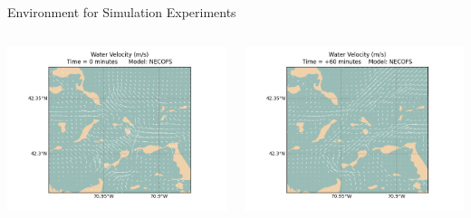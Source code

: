 \documentclass[9pt,xcolor=table]{beamer}
\begin{document}
\begin{frame}{Environment for Simulation Experiments}
\begin{columns}
\begin{column}{0.5\textwidth}
            \includegraphics[width=\textwidth,trim={0cm 0cm 0cm 0cm},clip]{img/full_water_1.png}
        \end{column}
        \begin{column}{0.5\textwidth}
            \includegraphics[width=\textwidth,trim={0cm 0cm 0cm 0cm},clip]{img/full_water_2.png}
        \end{column}
    \end{columns}
\end{frame}
\end{document}
